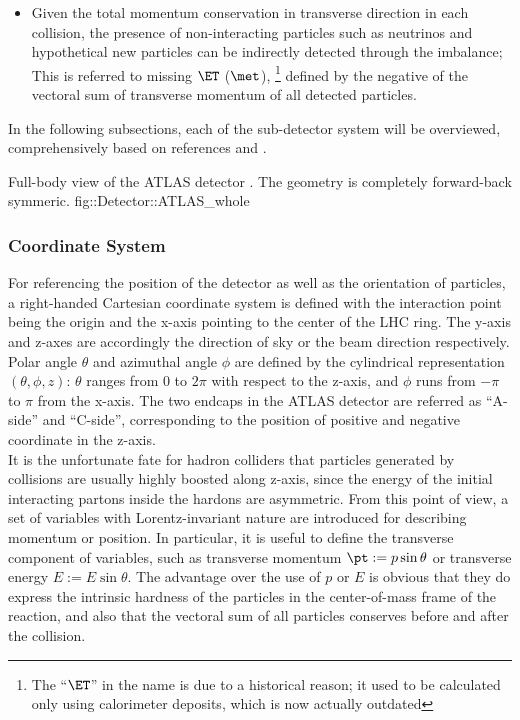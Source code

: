 \begin{itemize}
\item Given the total momentum conservation in transverse direction in each collision, 
the presence of non-interacting particles such as neutrinos and hypothetical new particles can be indirectly detected through the imbalance; 
This is referred to missing $\ET$ ($\met$), 
\footnote{The ``$\ET$'' in the name is due to a historical reason; it used to be calculated only using calorimeter deposits, which is now actually outdated
}
defined by the negative of the vectoral sum of transverse momentum of all detected particles.
\end{itemize}


In the following subsections, each of the sub-detector system will be overviewed, comprehensively based on references \cite{ATLAS_exp} and \cite{ATLAS_TDR}.

{Full-body view of the ATLAS detector \cite{ATLAScosmicPerf}. The geometry is completely forward-back symmeric.}
{fig::Detector::ATLAS_whole}


\subsubsection{Coordinate System}
For referencing the position of the detector as well as the orientation of particles, a right-handed Cartesian coordinate system is defined with the interaction point being the origin and the x-axis pointing to the center of the LHC ring. The y-axis and z-axes are accordingly the direction of sky or the beam direction respectively. Polar angle $\theta$ and azimuthal angle $\phi$ are defined by the cylindrical representation $(\theta,\phi,z)$: $\theta$ ranges from 0 to $2\pi$ with respect to the z-axis, and $\phi$ runs from $-\pi$ to $\pi$ from the x-axis. The two endcaps in the ATLAS detector are referred as ``A-side'' and ``C-side'', corresponding to the position of positive and negative coordinate in the z-axis. \\

It is the unfortunate fate for hadron colliders that particles generated by collisions are usually highly boosted along z-axis, since the energy of the initial interacting partons inside the hardons are asymmetric. From this point of view, a set of variables with Lorentz-invariant nature are introduced for describing momentum or position. In particular, it is useful to define the transverse component of variables, such as transverse momentum $\pt := p\sin{\theta}$ or transverse energy $E := E\sin{\theta}$. The advantage over the use of $p$ or $E$ is obvious that they do express the intrinsic hardness of the particles in the center-of-mass frame of the reaction, and also that the vectoral sum of all particles conserves before and after the collision. \\

